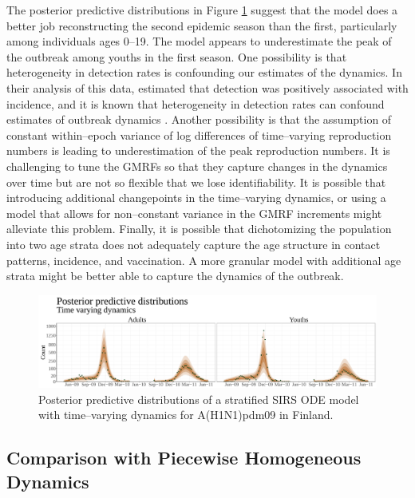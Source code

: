 The posterior predictive distributions in Figure \ref{fig:flupostpredsrwode} suggest that the model does a better job reconstructing the second epidemic season than the first, particularly among individuals ages 0--19. The model appears to underestimate the peak of the outbreak among youths in the first season. One possibility is that heterogeneity in detection rates is confounding our estimates of the dynamics. In their analysis of this data, \cite{shubin2016revealing} estimated that detection was positively associated with incidence, and it is known that heterogeneity in detection rates can confound estimates of outbreak dynamics \cite{caley2008quantifying,glass2011estimating,white2010reporting}. Another possibility is that the assumption of constant within--epoch variance of log differences of time--varying reproduction numbers is leading to underestimation of the peak reproduction numbers. It is challenging to tune the GMRFs so that they capture changes in the dynamics over time but are not so flexible that we lose identifiability. It is possible that introducing additional changepoints in the time--varying dynamics, or using a model that allows for non--constant variance in the GMRF increments might alleviate this problem. Finally, it is possible that dichotomizing the population into two age strata does not adequately capture the age structure in contact patterns, incidence, and vaccination. A more granular model with additional age strata might be better able to capture the dynamics of the outbreak.

\begin{figure}[htbp]
	\centering
	\includegraphics[width=\linewidth]{figures/flu_postpreds_rw_ode}
	\caption{Posterior predictive distributions of a stratified SIRS ODE model with time--varying dynamics for A(H1N1)pdm09 in Finland.}
	\label{fig:flupostpredsrwode}
\end{figure}

\subsection{Comparison with Piecewise Homogeneous Dynamics}
\label{subsec:flu_res_homog}


